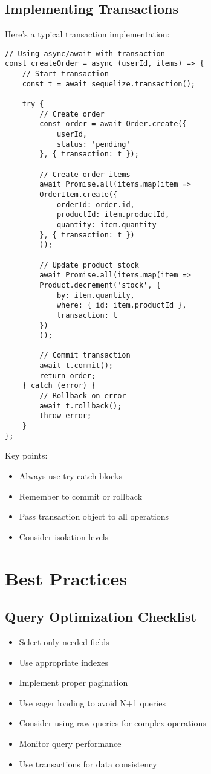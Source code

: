 \documentclass[12pt,a4paper]{book}
\begin{document}
	\subsection{Implementing Transactions}
	\begin{tcolorbox}[title=Basic Transaction Usage]
		Here's a typical transaction implementation:
		
		\begin{verbatim}
// Using async/await with transaction
const createOrder = async (userId, items) => {
	// Start transaction
	const t = await sequelize.transaction();
	
	try {
		// Create order
		const order = await Order.create({
			userId,
			status: 'pending'
		}, { transaction: t });
		
		// Create order items
		await Promise.all(items.map(item => 
		OrderItem.create({
			orderId: order.id,
			productId: item.productId,
			quantity: item.quantity
		}, { transaction: t })
		));
		
		// Update product stock
		await Promise.all(items.map(item =>
		Product.decrement('stock', {
			by: item.quantity,
			where: { id: item.productId },
			transaction: t
		})
		));
		
		// Commit transaction
		await t.commit();
		return order;
	} catch (error) {
		// Rollback on error
		await t.rollback();
		throw error;
	}
};
		\end{verbatim}
		
		Key points:
		\begin{itemize}
			\item Always use try-catch blocks
			\item Remember to commit or rollback
			\item Pass transaction object to all operations
			\item Consider isolation levels
		\end{itemize}
	\end{tcolorbox}
	
	\section{Best Practices}
	
	\subsection{Query Optimization Checklist}
	\begin{itemize}
		\item Select only needed fields
		\item Use appropriate indexes
		\item Implement proper pagination
		\item Use eager loading to avoid N+1 queries
		\item Consider using raw queries for complex operations
		\item Monitor query performance
		\item Use transactions for data consistency
	\end{itemize}
	
\end{document}
